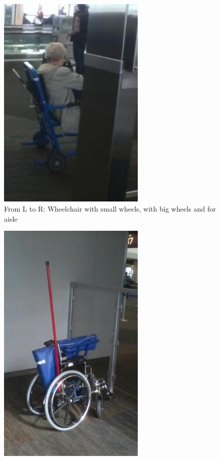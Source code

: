 \begin{list}{-}{}
\begin{figure}[h]
  \centering
     \includegraphics[width=7cm]{images/image034}
   \caption{From L to R: Wheelchair with small wheels, with big wheels and for aisle}
  \label{fig:34}
\end{figure}
\begin{figure}[h]
  \centering
     \includegraphics[width=7cm]{images/image035}
  \label{fig:35}
\end{figure}
\begin{figure}[h]
  \centering

\end{figure}
\end{list}
